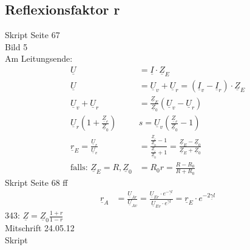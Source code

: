 \subsection{Reflexionsfaktor r}
Skript Seite 67\\
Bild 5\\
Am Leitungsende:\\
\begin{align}
	\underline{U}&=\underline{I}\cdot\underline{Z}_E\nonumber\\
	\underline{U}&=\underline{U}_v+\underline{U}_r=\left(\underline{I}_v-\underline{I}_r\right)\cdot\underline{Z}_E\nonumber\\
	\underline{U}_v+\underline{U}_r&=\frac{\underline{Z}_E}{\underline{Z}_0}\left(\underline{U}_v-\underline{U}_r\right)\nonumber\\
	\underline{U}_r\left(1+\frac{\underline{Z}_e}{\underline{Z}_0}\right)&s=\underline{U}_v\left(\frac{\underline{Z}_e}{\underline{Z}_0}-1\right)\nonumber\\
	\underline{r}_E=\frac{\underline{U}_r}{\underline{U}_v}&=\frac{\frac{\underline{Z}_e}{\underline{Z}_0}-1}{\frac{\underline{Z}_e}{\underline{Z}_0}+1}=\frac{\underline{Z}_E-\underline{Z}_0}{\underline{Z}_E+\underline{Z}_0}\nonumber\\
	\text{falls: }\underline{Z}_E=R, \underline{Z}_0&=R_0
	\boxed{r=\frac{R-R_0}{R+R_0}}\nonumber
\end{align}
Skript Seite 68 ff\\
\begin{align}
	\underline{r}_A&=\frac{\underline{U}_{Ar}}{\underline{U}_{Av}}=\frac{\underline{U}_{Er}\cdot
	e^{-\underline{\gamma}  l}}{\underline{U}_{Ev}\cdot e^{\underline{\gamma}
	l}}=\boxed{\underline{r}_E\cdot e^{-2\underline{\gamma}l}}\nonumber
\end{align}
343: $\underline{Z}=\underline{Z}_0\frac{1+r}{1-r}$\\

Mitschrift 24.05.12\\
Skript\\

